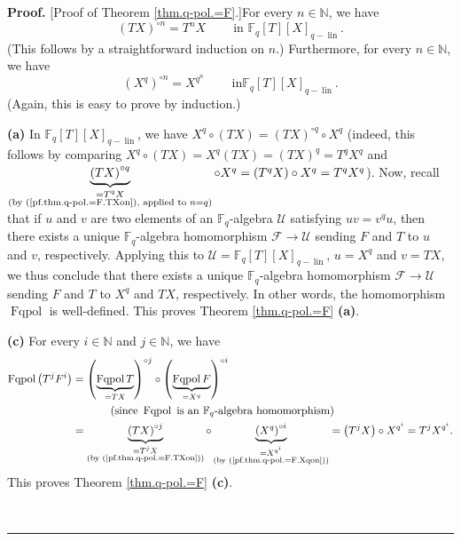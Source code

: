 \documentclass[numbers=enddot,12pt,final,onecolumn,notitlepage]{scrartcl}%
\theoremstyle{definition}
\newenvironment{proof}[1][Proof]{\noindent\textbf{#1.} }{\ \rule{0.5em}{0.5em}}
\begin{document}
\begin{proof}
[Proof of Theorem \ref{thm.q-pol.=F}.]For every $n\in\mathbb{N}$, we have%
\begin{equation}
\left(  TX\right)  ^{\circ n}=T^{n}X\ \ \ \ \ \ \ \ \ \ \text{in }%
\mathbb{F}_{q}\left[  T\right]  \left[  X\right]  _{q-\operatorname*{lin}}.
\label{pf.thm.q-pol.=F.TXon}%
\end{equation}
(This follows by a straightforward induction on $n$.) Furthermore, for every
$n\in\mathbb{N}$, we have%
\begin{equation}
\left(  X^{q}\right)  ^{\circ n}=X^{q^{n}}\ \ \ \ \ \ \ \ \ \ \text{in
}\mathbb{F}_{q}\left[  T\right]  \left[  X\right]  _{q-\operatorname*{lin}}.
\label{pf.thm.q-pol.=F.Xqon}%
\end{equation}
(Again, this is easy to prove by induction.)

\textbf{(a)} In $\mathbb{F}_{q}\left[  T\right]  \left[  X\right]
_{q-\operatorname*{lin}}$, we have $X^{q}\circ\left(  TX\right)  =\left(
TX\right)  ^{\circ q}\circ X^{q}$ (indeed, this follows by comparing
$X^{q}\circ\left(  TX\right)  =X^{q}\left(  TX\right)  =\left(  TX\right)
^{q}=T^{q}X^{q}$ and $\underbrace{\left(  TX\right)  ^{\circ q}}%
_{\substack{=T^{q}X\\\text{(by (\ref{pf.thm.q-pol.=F.TXon}), applied to
}n=q\text{)}}}\circ X^{q}=\left(  T^{q}X\right)  \circ X^{q}=T^{q}X^{q}$).
Now, recall that if $u$ and $v$ are two elements of an $\mathbb{F}_{q}%
$-algebra $\mathcal{U}$ satisfying $uv=v^{q}u$, then there exists a unique
$\mathbb{F}_{q}$-algebra homomorphism $\mathcal{F}\rightarrow\mathcal{U}$
sending $F$ and $T$ to $u$ and $v$, respectively. Applying this to
$\mathcal{U}=\mathbb{F}_{q}\left[  T\right]  \left[  X\right]
_{q-\operatorname*{lin}}$, $u=X^{q}$ and $v=TX$, we thus conclude that there
exists a unique $\mathbb{F}_{q}$-algebra homomorphism $\mathcal{F}%
\rightarrow\mathcal{U}$ sending $F$ and $T$ to $X^{q}$ and $TX$, respectively.
In other words, the homomorphism $\operatorname*{Fqpol}$ is well-defined. This
proves Theorem \ref{thm.q-pol.=F} \textbf{(a)}.

\textbf{(c)} For every $i\in\mathbb{N}$ and $j\in\mathbb{N}$, we have%
\begin{align*}
\operatorname*{Fqpol}\left(  T^{j}F^{i}\right)   &  =\left(
\underbrace{\operatorname*{Fqpol}T}_{=TX}\right)  ^{\circ j}\circ\left(
\underbrace{\operatorname*{Fqpol}F}_{=X^{q}}\right)  ^{\circ i}\\
&  \ \ \ \ \ \ \ \ \ \ \left(  \text{since }\operatorname*{Fqpol}\text{ is an
}\mathbb{F}_{q}\text{-algebra homomorphism}\right) \\
&  =\underbrace{\left(  TX\right)  ^{\circ j}}_{\substack{=T^{j}X\\\text{(by
(\ref{pf.thm.q-pol.=F.TXon}))}}}\circ\underbrace{\left(  X^{q}\right)  ^{\circ
i}}_{\substack{=X^{q^{i}}\\\text{(by (\ref{pf.thm.q-pol.=F.Xqon}))}}}=\left(
T^{j}X\right)  \circ X^{q^{i}}=T^{j}X^{q^{i}}.
\end{align*}
This proves Theorem \ref{thm.q-pol.=F} \textbf{(c)}.


\end{proof}
\end{document}
